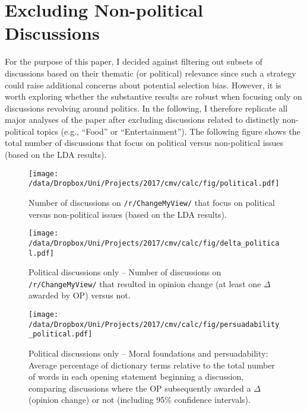 



\clearpage
\section{Excluding Non-political Discussions}\label{app:political}

For the purpose of this paper, I decided against filtering out subsets of discussions based on their thematic (or political) relevance since such a strategy could raise additional concerns about potential selection bias. However, it is worth exploring whether the substantive results are robust when focusing only on discussions revolving around politics. In the following, I therefore replicate all major analyses of the paper after excluding discussions related to distinctly non-political topics (e.g., ``Food'' or ``Entertainment''). The following figure shows the total number of discussions that focus on political versus non-political issues (based on the LDA results).

\begin{figure}[ht]
	\centering
	\texttt{[image: /data/Dropbox/Uni/Projects/2017/cmv/calc/fig/political.pdf]}
	\caption[Number of original posts on \texttt{/r/ChangeMyView/} that focus on political issues]{Number of discussions on \texttt{/r/ChangeMyView/} that focus on political versus non-political issues (based on the LDA results).}\label{fig:political}
\end{figure}

\begin{figure}[ht]
	\centering
	\texttt{[image: /data/Dropbox/Uni/Projects/2017/cmv/calc/fig/delta\_political.pdf]}
	\caption[Political discussions only -- Number of original posts on \texttt{/r/ChangeMyView/} that resulted in opinion change]{Political discussions only -- Number of discussions on \texttt{/r/ChangeMyView/} that resulted in opinion change (at least one $\Delta$ awarded by OP) versus not.}\label{fig:delta_political}
\end{figure}

\begin{figure}[ht]
	\centering
	\texttt{[image: /data/Dropbox/Uni/Projects/2017/cmv/calc/fig/persuadability\_political.pdf]}
	\caption[Political discussions only -- Moral foundations and persuadability]{Political discussions only -- Moral foundations and persuadability: Average percentage of dictionary terms relative to the total number of words in each opening statement beginning a discussion, comparing discussions where the OP subsequently awarded a $\Delta$ (opinion change) or not (including 95\% confidence intervals).}\label{fig:persuadability_political}
\end{figure}

